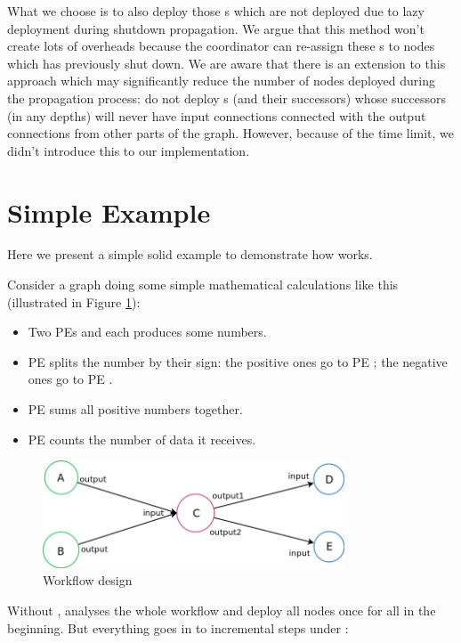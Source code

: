 What we choose is to also deploy those \tPEInst{}s which are not deployed due to lazy deployment during shutdown propagation. We argue that this method won't create lots of overheads because the coordinator can re-assign these \tPEInst{}s to nodes which has previously shut down. We are aware that there is an extension to this approach which may significantly reduce the number of nodes deployed during the propagation process: do not deploy \tPEInst{}s (and their successors) whose successors (in any depths) will never have input connections connected with the output connections from other parts of the graph. However, because of the time limit, we didn't introduce this to our implementation.

\section{Simple Example} \label{sec:incdep_example}
Here we present a simple solid example to demonstrate how \tincdep works.

Consider a graph doing some simple mathematical calculations like this (illustrated in Figure \ref{fig:incdep_example_0}):
  

\begin{itemize}
	\item Two PEs \ndA and \ndB each produces some numbers.
	\item PE \ndC splits the number by their sign: the positive ones go to PE \ndD; the negative ones go to PE \ndE.
	\item PE \ndD sums all positive numbers together.
	\item PE \ndE counts the number of data it receives.
\end{itemize}

\begin{figure}[h]\centering
    \includegraphics[width=0.8\textwidth]{figures/incdep_example_0}
	\caption{Workflow design}
	\label{fig:incdep_example_0}
\end{figure}

Without \tincdep, \dpy analyses the whole workflow and deploy all nodes once for all in the beginning. But everything goes in to incremental steps under \tincdep:

